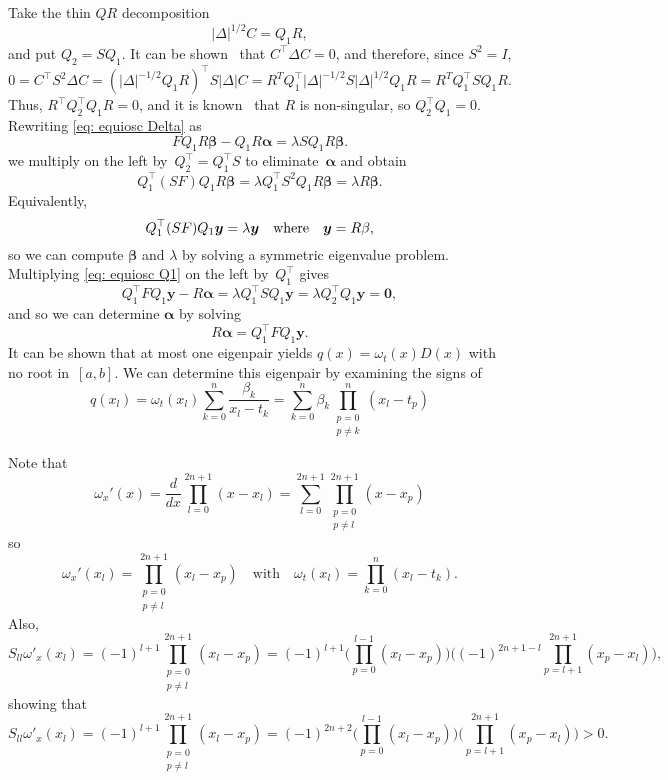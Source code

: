 \documentclass[12pt,a4paper]{article}
\begin{document}
Take the thin $QR$ decomposition
\[
|\Delta|^{1/2}C=Q_1R,
\]
and put $Q_2=SQ_1$.  It can be shown~\cite[Lemma~4.3]{FilipEtAl2018} that
$C^\top\Delta C=0$, and therefore, since $S^2=I$,
\[
0=C^\top S^2\Delta C=(|\Delta|^{-1/2}Q_1R)^\top S|\Delta|C
    =R^TQ_1^\top|\Delta|^{-1/2}S|\Delta|^{1/2}Q_1R
    =R^TQ_1^\top SQ_1R.
\]
Thus, $R^\top Q_2^\top Q_1R=0$, and it is 
known~\cite[Theorem~4.4]{FilipEtAl2018} that
$R$ is non-singular, so $Q_2^\top Q_1=0$.  Rewriting \eqref{eq: equiosc Delta} 
as
\begin{equation}\label{eq: equiosc Q1}
FQ_1R\boldsymbol{\beta}-Q_1R\boldsymbol{\alpha}
    =\lambda SQ_1R\boldsymbol{\beta}.
\end{equation}
we multiply on the left by~$Q_2^\top=Q_1^\top S$ to 
eliminate~$\boldsymbol{\alpha}$ and obtain
\[
Q_1^\top(SF)Q_1R\boldsymbol{\beta}=\lambda Q_1^\top S^2Q_1R\boldsymbol{\beta}
    =\lambda R\boldsymbol{\beta}.
\]
Equivalently,
\[
Q_1^\top(SF)Q_1\boldsymbol{y}=\lambda\boldsymbol{y}
\quad\text{where}\quad\boldsymbol{y}=R\bold\boldmath{\beta},
\]
so we can compute $\boldsymbol{\beta}$ and $\lambda$ by solving a symmetric 
eigenvalue problem.  Multiplying \eqref{eq: equiosc Q1} on the left 
by~$Q_1^\top$ gives
\[
Q_1^\top FQ_1\boldsymbol{y}-R\boldsymbol{\alpha}
    =\lambda Q_1^\top SQ_1\boldsymbol{y}
    =\lambda Q_2^\top Q_1\boldsymbol{y}=\boldsymbol{0},
\]
and so we can determine $\boldsymbol{\alpha}$ by solving
\[
R\boldsymbol{\alpha}=Q_1^\top FQ_1\boldsymbol{y}.
\]
It can be shown that at most one eigenpair yields $q(x)=\omega_t(x)D(x)$ with 
no root in~$[a,b]$.  We can determine this eigenpair by examining the signs of
\[
q(x_l)=\omega_t(x_l)\sum_{k=0}^n\frac{\beta_k}{x_l-t_k}
    =\sum_{k=0}^n\beta_k\prod_{\substack{p=0\\ p\ne k}}^n(x_l-t_p)
\]

Note that
\[
\omega_x'(x)=\frac{d}{dx}\prod_{l=0}^{2n+1}(x-x_l)
    =\sum_{l=0}^{2n+1}\prod_{\substack{p=0\\p\ne l}}^{2n+1}(x-x_p)
\]
so
\[
\omega_x'(x_l)=\prod_{\substack{p=0\\p\ne l}}^{2n+1}(x_l-x_p)
\quad\text{with}\quad
\omega_t(x_l)=\prod_{k=0}^n(x_l-t_k).
\]
Also,
\[
S_{ll}\omega'_x(x_l)=(-1)^{l+1}\prod_{\substack{p=0\\p\ne l}}^{2n+1}(x_l-x_p)
    =(-1)^{l+1}\biggl(\prod_{p=0}^{l-1}(x_l-x_p)\biggr)
    \biggl((-1)^{2n+1-l}\prod_{p=l+1}^{2n+1}(x_p-x_l)\biggr),
\]
showing that
\[
S_{ll}\omega'_x(x_l)=(-1)^{l+1}\prod_{\substack{p=0\\p\ne l}}^{2n+1}(x_l-x_p)
    =(-1)^{2n+2}\biggl(\prod_{p=0}^{l-1}(x_l-x_p)\biggr)
    \biggl(\prod_{p=l+1}^{2n+1}(x_p-x_l)\biggr)>0.
\]





\printbibliography
\end{document}
